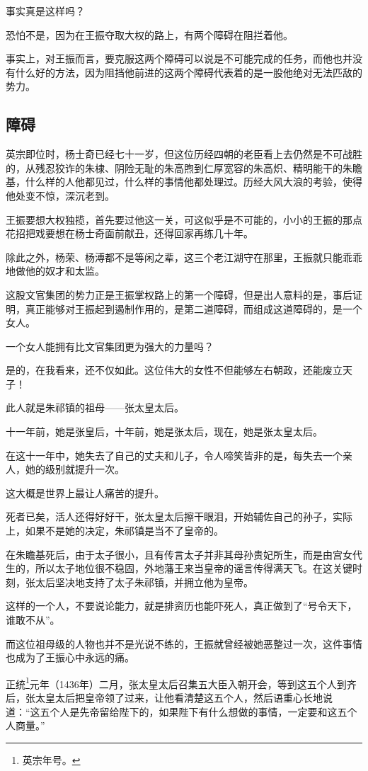 \begin{multicols}{\theparacolNo}
事实真是这样吗？

恐怕不是，因为在王振夺取大权的路上，有两个障碍在阻拦着他。

事实上，对王振而言，要克服这两个障碍可以说是不可能完成的任务，而他也并没有什么好的方法，因为阻挡他前进的这两个障碍代表着的是一股他绝对无法匹敌的势力。

\subsection{障碍}
英宗即位时，杨士奇已经七十一岁，但这位历经四朝的老臣看上去仍然是不可战胜的，从残忍狡诈的朱棣、阴险无耻的朱高煦到仁厚宽容的朱高炽、精明能干的朱瞻基，什么样的人他都见过，什么样的事情他都处理过。历经大风大浪的考验，使得他处变不惊，深沉老到。

王振要想大权独揽，首先要过他这一关，可这似乎是不可能的，小小的王振的那点花招把戏要想在杨士奇面前献丑，还得回家再练几十年。

除此之外，杨荣、杨溥都不是等闲之辈，这三个老江湖守在那里，王振就只能乖乖地做他的奴才和太监。

这股文官集团的势力正是王振掌权路上的第一个障碍，但是出人意料的是，事后证明，真正能够对王振起到遏制作用的，是第二道障碍，而组成这道障碍的，是一个女人。

一个女人能拥有比文官集团更为强大的力量吗？

是的，在我看来，还不仅如此。这位伟大的女性不但能够左右朝政，还能废立天子！

此人就是朱祁镇的祖母——张太皇太后。

十一年前，她是张皇后，十年前，她是张太后，现在，她是张太皇太后。

在这十一年中，她失去了自己的丈夫和儿子，令人啼笑皆非的是，每失去一个亲人，她的级别就提升一次。

这大概是世界上最让人痛苦的提升。

死者已矣，活人还得好好干，张太皇太后擦干眼泪，开始辅佐自己的孙子，实际上，如果不是她的决定，朱祁镇是当不了皇帝的。

在朱瞻基死后，由于太子很小，且有传言太子并非其母孙贵妃所生，而是由宫女代生的，所以太子地位很不稳固，外地藩王来当皇帝的谣言传得满天飞。在这关键时刻，张太后坚决地支持了太子朱祁镇，并拥立他为皇帝。

这样的一个人，不要说论能力，就是排资历也能吓死人，真正做到了“号令天下，谁敢不从”。

而这位祖母级的人物也并不是光说不练的，王振就曾经被她恶整过一次，这件事情也成为了王振心中永远的痛。

正统\footnote{英宗年号。}元年（1436年）二月，张太皇太后召集五大臣入朝开会，等到这五个人到齐后，张太皇太后把皇帝领了过来，让他看清楚这五个人，然后语重心长地说道：“这五个人是先帝留给陛下的，如果陛下有什么想做的事情，一定要和这五个人商量。”


\end{multicols}
